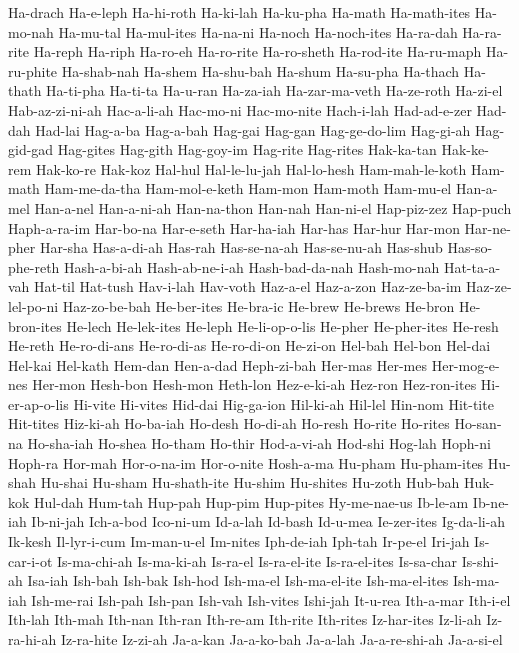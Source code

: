 {  Ha-drach Ha-e-leph Ha-hi-roth Ha-ki-lah Ha-ku-pha Ha-math
  Ha-math-ites Ha-mo-nah Ha-mu-tal Ha-mul-ites Ha-na-ni Ha-noch
  Ha-noch-ites Ha-ra-dah Ha-ra-rite Ha-reph Ha-riph Ha-ro-eh
  Ha-ro-rite Ha-ro-sheth Ha-rod-ite Ha-ru-maph Ha-ru-phite Ha-shab-nah
  Ha-shem Ha-shu-bah Ha-shum Ha-su-pha Ha-thach Ha-thath
  Ha-ti-pha Ha-ti-ta Ha-u-ran Ha-za-iah Ha-zar-ma-veth Ha-ze-roth
  Ha-zi-el Hab-az-zi-ni-ah Hac-a-li-ah Hac-mo-ni Hac-mo-nite Hach-i-lah
  Had-ad-e-zer Had-dah Had-lai Hag-a-ba Hag-a-bah Hag-gai
  Hag-gan Hag-ge-do-lim Hag-gi-ah Hag-gid-gad Hag-gites Hag-gith
  Hag-goy-im Hag-rite Hag-rites Hak-ka-tan Hak-ke-rem Hak-ko-re
  Hak-koz Hal-hul Hal-le-lu-jah Hal-lo-hesh Ham-mah-le-koth Ham-math
  Ham-me-da-tha Ham-mol-e-keth Ham-mon Ham-moth Ham-mu-el Han-a-mel
  Han-a-nel Han-a-ni-ah Han-na-thon Han-nah Han-ni-el Hap-piz-zez
  Hap-puch Haph-a-ra-im Har-bo-na Har-e-seth Har-ha-iah Har-has
  Har-hur Har-mon Har-ne-pher Har-sha Has-a-di-ah Has-rah
  Has-se-na-ah Has-se-nu-ah Has-shub Has-so-phe-reth Hash-a-bi-ah Hash-ab-ne-i-ah
  Hash-bad-da-nah Hash-mo-nah Hat-ta-a-vah Hat-til Hat-tush Hav-i-lah
  Hav-voth Haz-a-el Haz-a-zon Haz-ze-ba-im Haz-ze-lel-po-ni Haz-zo-be-bah
  He-ber-ites He-bra-ic He-brew He-brews He-bron He-bron-ites
  He-lech He-lek-ites He-leph He-li-op-o-lis He-pher He-pher-ites
  He-resh He-reth He-ro-di-ans He-ro-di-as He-ro-di-on He-zi-on
  Hel-bah Hel-bon Hel-dai Hel-kai Hel-kath Hem-dan
  Hen-a-dad Heph-zi-bah Her-mas Her-mes Her-mog-e-nes Her-mon
  Hesh-bon Hesh-mon Heth-lon Hez-e-ki-ah Hez-ron Hez-ron-ites
  Hi-er-ap-o-lis Hi-vite Hi-vites Hid-dai Hig-ga-ion Hil-ki-ah
  Hil-lel Hin-nom Hit-tite Hit-tites Hiz-ki-ah Ho-ba-iah
  Ho-desh Ho-di-ah Ho-resh Ho-rite Ho-rites Ho-san-na
  Ho-sha-iah Ho-shea Ho-tham Ho-thir Hod-a-vi-ah Hod-shi
  Hog-lah Hoph-ni Hoph-ra Hor-mah Hor-o-na-im Hor-o-nite
  Hosh-a-ma Hu-pham Hu-pham-ites Hu-shah Hu-shai Hu-sham
  Hu-shath-ite Hu-shim Hu-shites Hu-zoth Hub-bah Huk-kok
  Hul-dah Hum-tah Hup-pah Hup-pim Hup-pites Hy-me-nae-us
  Ib-le-am Ib-ne-iah Ib-ni-jah Ich-a-bod Ico-ni-um Id-a-lah
  Id-bash Id-u-mea Ie-zer-ites Ig-da-li-ah Ik-kesh Il-lyr-i-cum
  Im-man-u-el Im-nites Iph-de-iah Iph-tah Ir-pe-el Iri-jah
  Is-car-i-ot Is-ma-chi-ah Is-ma-ki-ah Is-ra-el Is-ra-el-ite Is-ra-el-ites
  Is-sa-char Is-shi-ah Isa-iah Ish-bah Ish-bak Ish-hod
  Ish-ma-el Ish-ma-el-ite Ish-ma-el-ites Ish-ma-iah Ish-me-rai Ish-pah
  Ish-pan Ish-vah Ish-vites Ishi-jah It-u-rea Ith-a-mar
  Ith-i-el Ith-lah Ith-mah Ith-nan Ith-ran Ith-re-am
  Ith-rite Ith-rites Iz-har-ites Iz-li-ah Iz-ra-hi-ah Iz-ra-hite
  Iz-zi-ah Ja-a-kan Ja-a-ko-bah Ja-a-lah Ja-a-re-shi-ah Ja-a-si-el
}
